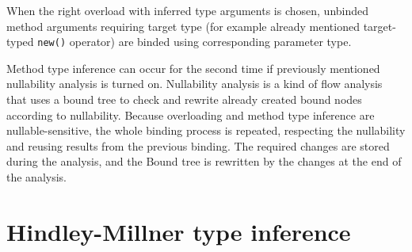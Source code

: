 When the right overload with inferred type arguments is chosen, unbinded method arguments requiring target type (for example already mentioned target-typed \texttt{new()} operator) are binded using corresponding parameter type.
\par
Method type inference can occur for the second time if previously mentioned nullability analysis is turned on. 
Nullability analysis is a kind of flow analysis that uses a bound tree to check and rewrite already created bound nodes according to nullability. 
Because overloading and method type inference are nullable-sensitive, the whole binding process is repeated, respecting the nullability and reusing results from the previous binding. 
The required changes are stored during the analysis, and the Bound tree is rewritten by the changes at the end of the analysis.

\section{Hindley-Millner type inference}

